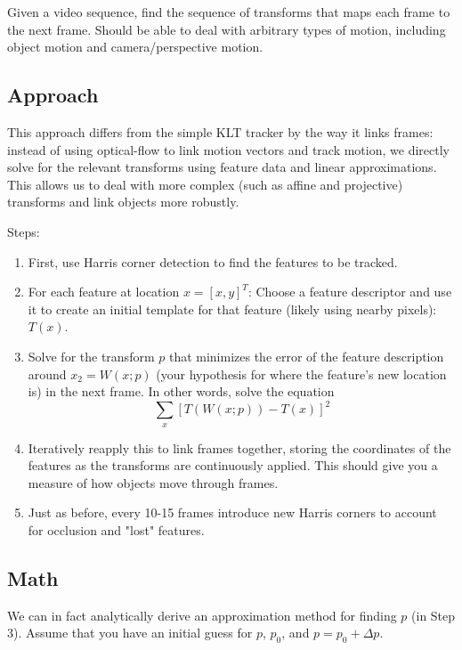 \documentclass{article}
\begin{document}
Given a video sequence, find the sequence of transforms that maps each frame to the next frame. Should be able to deal with arbitrary types of motion, including object motion and camera/perspective motion.

\subsection{Approach}

This approach differs from the simple KLT tracker by the way it links frames: instead of using optical-flow to link motion vectors and track motion, we directly solve for the relevant transforms using feature data and linear approximations. This allows us to deal with more complex (such as affine and projective) transforms and link objects more robustly.

Steps:
\begin{enumerate}

\item{First, use Harris corner detection to find the features to be tracked.}

\item{For each feature at location $x= [x, y]^T$: Choose a feature descriptor and use it to create an initial template for that feature (likely using nearby pixels): $T(x)$.}

\item{Solve for the transform $p$ that minimizes the error of the feature description around $x_2 = W(x;p)$ (your hypothesis for where the feature's new location is) in the next frame. In other words, solve the equation $$\sum_x {[T(W(x;p)) - T(x)]^2}$$}

\item{Iteratively reapply this to link frames together, storing the coordinates of the features as the transforms are continuously applied. This should give you a measure of how objects move through frames. }

\item{Just as before, every 10-15 frames introduce new Harris corners to account for occlusion and "lost" features.}

\end{enumerate}

\subsection{Math}

We can in fact analytically derive an approximation method for finding $p$ (in Step 3). Assume that you have an initial guess for $p$, $p_0$, and $p = p_0 + \Delta p$. 
\end{document}
